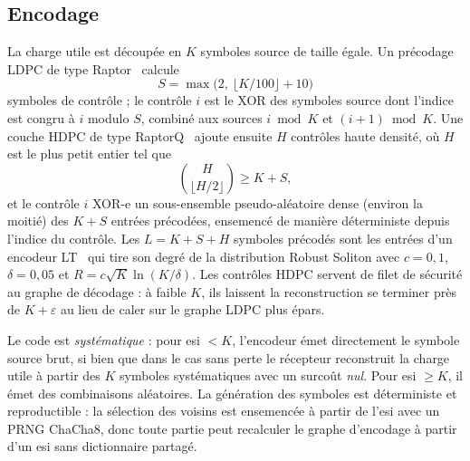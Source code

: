 \documentclass[conference]{IEEEtran}
\begin{document}
\subsection{Encodage}
La charge utile est découpée en $K$ symboles source de taille égale. Un
précodage LDPC de type Raptor~\cite{shokrollahi2006raptor,rfc5053} calcule
\begin{equation}
S = \max\!\bigl(2,\ \lfloor K/100\rfloor + 10\bigr)
\end{equation}
symboles de contrôle ; le contrôle $i$ est le XOR des symboles source dont
l'indice est congru à $i$ modulo $S$, combiné aux sources $i\bmod K$ et
$(i{+}1)\bmod K$. Une couche HDPC de type RaptorQ~\cite{rfc6330} ajoute ensuite
$H$ contrôles haute densité, où $H$ est le plus petit entier tel que
\begin{equation}
\binom{H}{\lfloor H/2\rfloor} \ge K + S,
\end{equation}
et le contrôle $i$ XOR-e un sous-ensemble pseudo-aléatoire dense (environ la
moitié) des $K+S$ entrées précodées, ensemencé de manière déterministe depuis
l'indice du contrôle. Les $L=K+S+H$ symboles précodés sont les entrées d'un
encodeur LT~\cite{luby2002lt} qui tire son degré de la distribution Robust
Soliton avec $c=0{,}1$, $\delta=0{,}05$ et $R=c\sqrt{K}\ln(K/\delta)$. Les
contrôles HDPC servent de filet de sécurité au graphe de décodage : à faible
$K$, ils laissent la reconstruction se terminer près de $K+\varepsilon$ au lieu
de caler sur le graphe LDPC plus épars.

Le code est \emph{systématique} : pour esi $<K$, l'encodeur émet directement le
symbole source brut, si bien que dans le cas sans perte le récepteur
reconstruit la charge utile à partir des $K$ symboles systématiques avec un
surcoût \emph{nul}. Pour esi $\ge K$, il émet des combinaisons aléatoires. La
génération des symboles est déterministe et reproductible : la sélection des
voisins est ensemencée à partir de l'esi avec un PRNG ChaCha8, donc toute
partie peut recalculer le graphe d'encodage à partir d'un esi sans dictionnaire
partagé.
\end{document}
